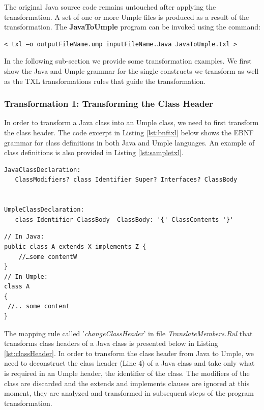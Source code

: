 The original Java source code remains untouched after applying the transformation. A set of one or more Umple files is produced as a result of the transformation. The \textbf{JavaToUmple} program can be invoked using the command:

\vspace{\baselineskip}
\begin{lstlisting}[style=umplePlain]
< txl –o outputFileName.ump inputFileName.Java JavaToUmple.txl >
\end{lstlisting}

In the following sub-section we provide some transformation examples. We first show the Java and Umple grammar for the single constructs we transform as well as the TXL transformations rules that guide the transformation.

\subsubsection{Transformation 1: Transforming the Class Header} 

In order to transform a Java class into an Umple class, we need to first transform the class header. The code excerpt in Listing \ref{lst:bnftxl} below shows the EBNF grammar for class definitions in both Java and Umple languages. An example of class definitions is also provided in Listing \ref{lst:sampletxl}.

\begin{lstlisting}[style=umplePlain, caption="Class definition grammar in BNF form", label=lst:bnftxl]
JavaClassDeclaration: 
   ClassModifiers? class Identifier Super? Interfaces? ClassBody


UmpleClassDeclaration: 
   class Identifier ClassBody  ClassBody: '{' ClassContents '}'

\end{lstlisting}

\begin{lstlisting}[style=umplePlain, caption=Class definitions in Java and Umple, label=lst:sampletxl]
// In Java:
public class A extends X implements Z {
    //…some contentW
}
// In Umple:
class A 
{	
 //.. some content
}
\end{lstlisting}

The mapping rule called '\textit{changeClassHeader}' in file \textit{TranslateMembers.Rul} that transforms class headers of a Java class is presented below in Listing \ref{lst:classHeader}. In order to transform the class header from Java to Umple, we need to deconstruct the class header  (Line 4)  of a Java class and take only what is required in an Umple header, the identifier of the class. The modifiers of the class are discarded and the extends and implements clauses are ignored at this moment, they are analyzed and transformed in subsequent steps of the program transformation. 

